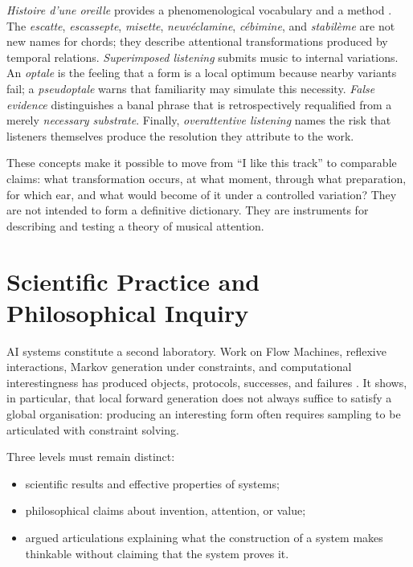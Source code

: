 \documentclass[11pt,a4paper]{article}
\begin{document}
\emph{Histoire d'une oreille} provides a phenomenological vocabulary and a
method \parencite{pachet2018oreille}. The \emph{escatte}, \emph{escassepte},
\emph{misette}, \emph{neuvéclamine}, \emph{cébimine}, and \emph{stabilème} are
not new names for chords; they describe attentional transformations produced by
temporal relations. \emph{Superimposed listening} submits music to internal
variations. An \emph{optale} is the feeling that a form is a local optimum
because nearby variants fail; a \emph{pseudoptale} warns that familiarity may
simulate this necessity. \emph{False evidence} distinguishes a banal phrase
that is retrospectively requalified from a merely \emph{necessary substrate}.
Finally, \emph{overattentive listening} names the risk that listeners themselves
produce the resolution they attribute to the work.

These concepts make it possible to move from ``I like this track'' to comparable
claims: what transformation occurs, at what moment, through what preparation,
for which ear, and what would become of it under a controlled variation? They are
not intended to form a definitive dictionary. They are instruments for
describing and testing a theory of musical attention.

\section{Scientific Practice and Philosophical Inquiry}

AI systems constitute a second laboratory. Work on Flow Machines, reflexive
interactions, Markov generation under constraints, and computational
interestingness has produced objects, protocols, successes, and failures
\parencite{pachet2006clefs,pachet2008machines,pachet2012virtuosity,pachet2021assisted,pachet2026markov}.
It shows, in particular, that local forward generation does not always suffice
to satisfy a global organisation: producing an interesting form often requires
sampling to be articulated with constraint solving.

Three levels must remain distinct:

\begin{itemize}
  \item scientific results and effective properties of systems;
  \item philosophical claims about invention, attention, or value;
  \item argued articulations explaining what the construction of a system makes
        thinkable without claiming that the system proves it.
\end{itemize}
\end{document}
